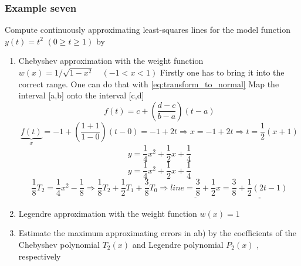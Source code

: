 \subsubsection{Example seven}
Compute continuously approximating least-squares lines for the model function
$y(t)=t^2$ $(0\geq t \geq 1 )$ by
\begin{enumerate}[label=(\alph*)]
    \item Chebyshev approximation with the weight function $w(x)=1 / \sqrt{1-x^2} \quad(-1<x<1)$\newline\newline
    Firstly one has to bring it into the correct range. One can do that with \autoref{eq:transform_to_normal} \newline
    Map the interval [a,b] onto the interval [c,d] 
    \begin{equation}
f(t)=c+\left(\frac{d-c}{b-a}\right)(t-a)
\end{equation}
$$
\underbrace{f(t)}_{x}=-1+\left(\frac{1+1}{1-0}\right)(t-0)=-1+2t \Rightarrow x=-1+2t \Rightarrow t=\frac{1}{2}(x+1) 
$$
$$
y=\frac{1}{4} x^2+\frac{1}{2} x+\frac{1}{4}
$$
$$
y=\frac{1}{4} x^2+\frac{1}{2} x+\frac{1}{4}
$$
$$
\frac{1}{8}T_2=\frac{1}{4} x^2-\frac{1}{8}\Rightarrow \frac{1}{8}T_2+\frac{1}{2}T_1+\frac{3}{8}T_0\Rightarrow \underline{line=\frac{3}{8}+\frac{1}{2}x}=\underline{\underline{\frac{3}{8}+\frac{1}{2}(2t-1)}}
$$
\item Legendre approximation with the weight function $w(x)=1$
    \item Estimate the maximum approximating errors in ab) by the coefficients of the Chebyshev polynomial $T_2(x)$ and Legendre polynomial $P_2(x)$ , respectively
    
\end{enumerate}